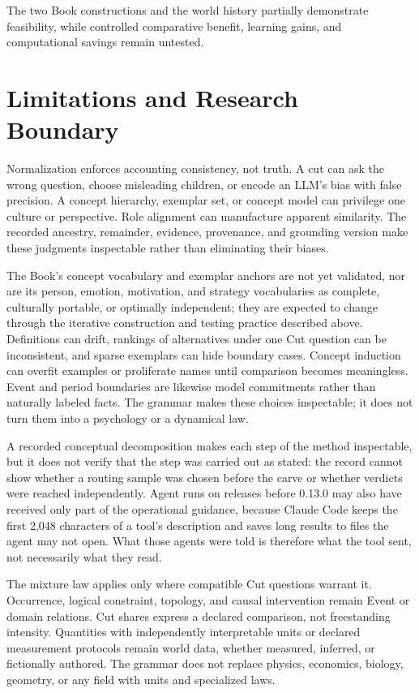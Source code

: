 \documentclass[11pt,a4paper]{article}
\begin{document}
The two Book constructions and the world history partially demonstrate
feasibility, while controlled comparative benefit, learning gains, and
computational savings remain untested.

\section{Limitations and Research Boundary}
\label{sec:limitations}

Normalization enforces accounting consistency, not truth. A cut can ask the
wrong question, choose misleading children, or encode an LLM's bias with false
precision. A concept hierarchy, exemplar set, or concept model can privilege
one culture or perspective. Role alignment can manufacture apparent similarity.
The recorded ancestry, remainder, evidence, provenance, and grounding version
make these judgments inspectable rather than eliminating their biases.

The Book's concept vocabulary and exemplar anchors are not yet validated, nor
are its person, emotion, motivation, and strategy vocabularies as complete,
culturally portable, or optimally independent; they are expected to change
through the iterative construction and testing practice described above.
Definitions can drift, rankings of alternatives under one Cut question can be
inconsistent, and sparse exemplars can hide boundary cases. Concept induction
can overfit examples or proliferate names until comparison becomes meaningless.
Event and period boundaries are likewise model commitments rather than naturally
labeled facts. The grammar makes these choices inspectable; it does not turn them
into a psychology or a dynamical law.

A recorded conceptual decomposition makes each step of the method inspectable,
but it does not verify that the step was carried out as stated: the record
cannot show whether a routing sample was chosen before the carve or whether
verdicts were reached independently. Agent runs on releases before 0.13.0 may
also have received only part of the operational guidance, because Claude Code
keeps the first 2,048 characters of a tool's description and saves long results
to files the agent may not open. What those agents were told is therefore what
the tool sent, not necessarily what they read.

The mixture law applies only where compatible Cut questions warrant it.
Occurrence, logical constraint, topology, and causal intervention remain Event
or domain relations. Cut shares express a declared comparison, not freestanding
intensity. Quantities with independently interpretable units or declared
measurement protocols remain world data,
whether measured, inferred, or fictionally authored. The grammar does not replace
physics, economics, biology, geometry, or any field with units and specialized laws.
\end{document}
